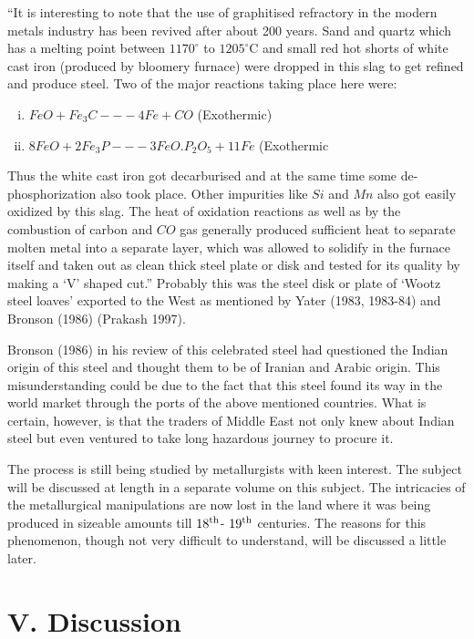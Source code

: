 {\small “It is interesting to note that the use of graphitised refractory in the modern metals industry has been revived after about 200 years. Sand and quartz which has a melting point between $1170^\circ$ to $1205^\circ$C and small red hot shorts of white cast iron (produced by bloomery furnace) were dropped in this slag to get refined and produce steel. Two of the major reactions taking place here were:}
{\small\begin{enumerate}[(i)]
\item $FeO + Fe_3C---4Fe + CO$ (Exothermic)                                     
\item $8FeO + 2Fe_3P--- 3FeO.P_2O_5 + 11Fe$ (Exothermic
\end{enumerate}}

{\small Thus the white cast iron got decarburised and at the same time some de-phosphorization also took place. Other impurities like $Si$ and $Mn$ also got easily oxidized by this slag. The heat of oxidation reactions as well as by the combustion of carbon and $CO$ gas generally produced sufficient heat to separate molten metal into a separate layer, which was allowed to solidify in the furnace itself and taken out as clean thick steel plate or disk and tested for its quality by making a ‘V’ shaped cut.”}  Probably this was the steel disk or plate of ‘Wootz steel loaves’ exported to the West as mentioned by Yater (1983, 1983-84) and Bronson (1986) (Prakash 1997).

Bronson (1986) in his review of this celebrated steel had questioned the Indian origin of this steel and thought them to be of Iranian and Arabic origin. This misunderstanding could be due to the fact that this steel found its way in the world market through the ports of the above mentioned countries. What is certain, however, is that the traders of Middle East not only knew about Indian steel but even ventured to take long hazardous journey to procure it.

The process is still being studied by metallurgists with keen interest. The subject will be discussed at length in a separate volume on this subject. The intricacies of the metallurgical manipulations are now lost in the land where it was being produced in sizeable amounts till $18^{\rm th}$- $19^{\rm th}$ centuries. The reasons for this phenomenon, though not very difficult to understand, will be discussed a little later. 

\vspace{-.3cm}

\section*{V. Discussion }\label{section-5}

